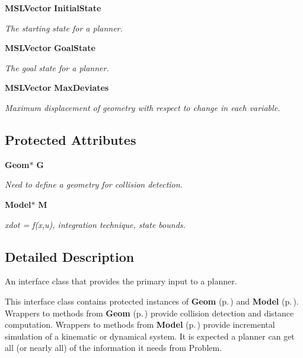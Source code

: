 \begin{CompactItemize}
{\bf MSLVector} {\bf Initial\-State}
\begin{CompactList}\small\item\em The starting state for a planner.\item\end{CompactList}\item 
{\bf MSLVector} {\bf Goal\-State}
\begin{CompactList}\small\item\em The goal state for a planner.\item\end{CompactList}\item 
{\bf MSLVector} {\bf Max\-Deviates}
\begin{CompactList}\small\item\em Maximum displacement of geometry with respect to change in each variable.\item\end{CompactList}\end{CompactItemize}
\subsection*{Protected Attributes}
\begin{CompactItemize}
\item 
{\bf Geom}$\ast$ {\bf G}
\begin{CompactList}\small\item\em Need to define a geometry for collision detection.\item\end{CompactList}\item 
{\bf Model}$\ast$ {\bf M}
\begin{CompactList}\small\item\em xdot = f(x,u), integration technique, state bounds.\item\end{CompactList}\end{CompactItemize}


\subsection{Detailed Description}
An interface class that provides the primary input to a planner.

This interface class contains protected instances of {\bf Geom} {\rm (p.\,\pageref{classGeom})} and {\bf Model} {\rm (p.\,\pageref{classModel})}. Wrappers to methods from {\bf Geom} {\rm (p.\,\pageref{classGeom})} provide collision detection and distance computation. Wrappers to methods from {\bf Model} {\rm (p.\,\pageref{classModel})} provide incremental simulation of a kinematic or dynamical system. It is expected a planner can get all (or nearly all) of the information it needs from Problem. 



